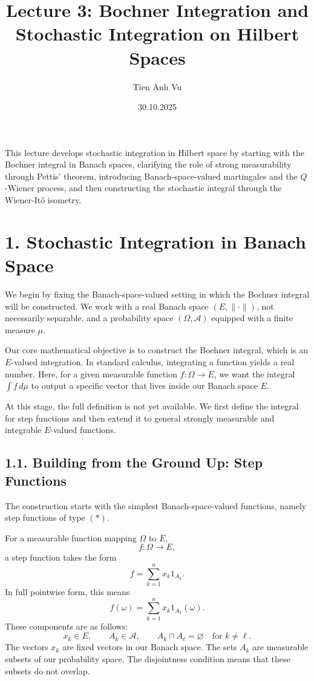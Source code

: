 \documentclass[11pt]{article}
\title{Lecture 3: Bochner Integration and Stochastic Integration on Hilbert Spaces}
\date{30.10.2025}
\author{Tien Anh Vu}
\theoremstyle{definition}
\theoremstyle{remark}
\begin{document}
\maketitle

This lecture develops stochastic integration in Hilbert space by starting with the Bochner integral in Banach spaces, clarifying the role of strong measurability through Pettis' theorem, introducing Banach-space-valued martingales and the \(Q\)-Wiener process, and then constructing the stochastic integral through the Wiener-It\^o isometry.

\section*{1. Stochastic Integration in Banach Space}
We begin by fixing the Banach-space-valued setting in which the Bochner integral will be constructed. We work with a real Banach space \((E,\|\cdot\|)\), not necessarily separable, and a probability space \((\Omega,\mathcal A)\) equipped with a finite measure \(\mu\).

Our core mathematical objective is to construct the Bochner integral, which is an \(E\)-valued integration. In standard calculus, integrating a function yields a real number. Here, for a given measurable function \(f:\Omega\to E\), we want the integral \(\int f\,d\mu\) to output a specific vector that lives inside our Banach space \(E\).

At this stage, the full definition is not yet available. We first define the integral for step functions and then extend it to general strongly measurable and integrable \(E\)-valued functions.

\subsection*{1.1. Building from the Ground Up: Step Functions}
The construction starts with the simplest Banach-space-valued functions, namely step functions of type \((*)\).

For a measurable function mapping \(\Omega\) to \(E\),
\[
f:\Omega\to E,
\]
a step function takes the form
\[
f=\sum_{k=1}^{n} x_k 1_{A_k}. \tag{*}
\]
In full pointwise form, this means
\[
f(\omega)=\sum_{k=1}^{n} x_k 1_{A_k}(\omega).
\]
These components are as follows:
\[
x_k\in E,
\qquad
A_k\in \mathcal A,
\qquad
A_k\cap A_\ell=\varnothing \quad \text{for } k\neq \ell.
\]
The vectors \(x_k\) are fixed vectors in our Banach space. The sets \(A_k\) are measurable subsets of our probability space. The disjointness condition means that these subsets do not overlap.
\end{document}
